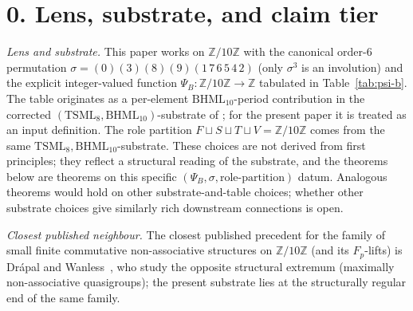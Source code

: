\documentclass[11pt,reqno]{amsart}
\theoremstyle{plain}
\theoremstyle{definition}
\theoremstyle{remark}
\newcommand{\Z}{\mathbb{Z}}
\newcommand{\TS}{\mathrm{TSML}}
\newcommand{\BH}{\mathrm{BHML}}
\newcommand{\sig}{\sigma}
\begin{document}
\section*{0. Lens, substrate, and claim tier}
\label{sec:lens}

\emph{Lens and substrate.} This paper works on $\Z/10\Z$ with the
canonical order-$6$ permutation
$\sig = (0)(3)(8)(9)(1\,7\,6\,5\,4\,2)$ (only $\sig^{3}$ is an
involution) and the explicit
integer-valued function $\Psi_B : \Z/10\Z \to \Z$ tabulated in
Table~\ref{tab:psi-b}.  The table originates as a per-element
$\BH_{10}$-period contribution in the corrected $(\TS_{8},
\BH_{10})$-substrate of \cite{SandersGishFourCore,SandersBridgeWP9};
for the present paper it is treated as an input definition.  The
role partition $F \sqcup S \sqcup T \sqcup V = \Z/10\Z$ comes from the
same $\TS_{8}, \BH_{10}$-substrate.  These choices are not derived
from first principles; they reflect a structural reading of the
substrate, and the theorems below are theorems on this specific
$(\Psi_B, \sig, \text{role-partition})$ datum.  Analogous theorems
would hold on other substrate-and-table choices; whether other
substrate choices give similarly rich downstream connections is open.

\emph{Closest published neighbour.} The closest published precedent
for the family of small finite commutative non-associative structures
on $\Z/10\Z$ (and its $F_{p}$-lifts) is Drápal and
Wanless~\cite{DrapalWanless2021}, who study the opposite structural
extremum (maximally non-associative quasigroups); the present
substrate lies at the structurally regular end of the same family.
\end{document}
